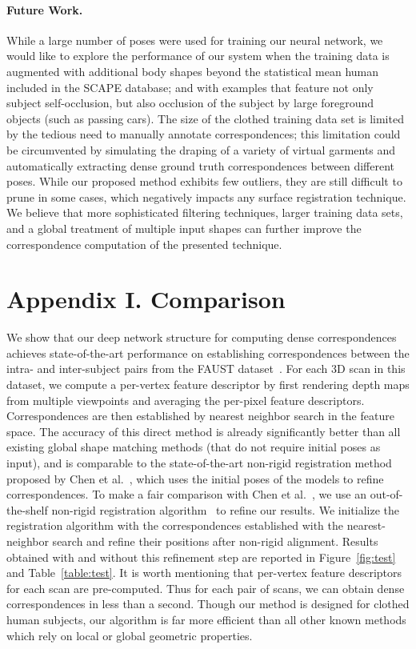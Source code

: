 \documentclass[10pt,twocolumn,letterpaper]{article}
\begin{document}
\paragraph{Future Work.} While a large number of poses were used for training our neural network, we would like to explore the performance of our system when the training data is augmented with additional body shapes beyond the statistical mean human included in the SCAPE database; and with examples that feature not only subject self-occlusion, but also occlusion of the subject by large foreground objects (such as passing cars). The size of the clothed training data set is limited by the tedious need to manually annotate correspondences; this limitation could be circumvented by simulating the draping of a variety of virtual garments and automatically extracting dense ground truth correspondences between different poses. While our proposed method exhibits few outliers, they are still difficult to prune in some cases, which negatively impacts any surface registration technique. We believe that more sophisticated filtering techniques, larger training data sets, and a global treatment of multiple input shapes can further improve the correspondence computation of the presented technique.



\section*{Appendix I. Comparison}
We show that our deep network structure for computing dense correspondences achieves state-of-the-art performance on establishing correspondences between the intra- and inter-subject pairs from the FAUST dataset~\cite{Bogo:CVPR:2014}. For each 3D scan in this dataset, we compute a per-vertex feature descriptor by first rendering depth maps from multiple viewpoints and averaging the per-pixel feature descriptors. %
Correspondences are then established by nearest neighbor search in the feature space. The accuracy of this direct method is already significantly better than all existing global shape matching methods (that do not require initial poses as input), and is comparable to the state-of-the-art non-rigid registration method proposed by Chen et al.~\cite{chen15}, which uses the initial poses of the models to refine correspondences. To make a fair comparison with Chen et al.~\cite{chen15}, we use an out-of-the-shelf non-rigid registration algorithm~\cite{li08global} to refine our results. We initialize the registration algorithm with the correspondences established with the nearest-neighbor search and refine their positions after non-rigid alignment. Results obtained with and without this refinement step are reported in Figure~\ref{fig:test} and Table~\ref{table:test}.
It is worth mentioning that per-vertex feature descriptors for each scan are pre-computed. Thus for each pair of scans, we can obtain dense correspondences in less than a second. Though our method is designed for clothed human subjects, our algorithm is far more efficient than all other known methods which rely on local or global geometric properties.
\end{document}
